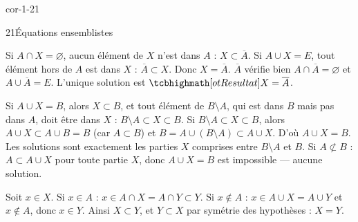 \begin{blocLivre}{cor-1-21}
\begin{corrige}{21}{Équations ensemblistes}
\begin{questions}
  \item {} Si $A\cap X=\varnothing$, aucun élément de $X$ n'est dans $A$ :
    $X\subset\overline{A}$. Si $A\cup X=E$, tout élément hors de $A$ est dans $X$ :
    $\overline{A}\subset X$. Donc $X=\overline{A}$.\quad
     $\overline{A}$ vérifie bien $A\cap\overline{A}=\varnothing$ et
    $A\cup\overline{A}=E$. L'unique solution est $\res{X=\overline{A}}$.
  \item {} Si $A\cup X=B$, alors $X\subset B$, et tout élément de $B\setminus A$, qui est
    dans $B$ mais pas dans $A$, doit être dans $X$ : $B\setminus A\subset X\subset B$.\quad
     Si $B\setminus A\subset X\subset B$, alors $A\cup X\subset A\cup B=B$ (car
    $A\subset B$) et $B=A\cup(B\setminus A)\subset A\cup X$. D'où $A\cup X=B$. Les solutions sont
    exactement les parties $X$ comprises entre $B\setminus A$ et $B$. Si $A\not\subset B$ :
    $A\subset A\cup X$ pour toute partie $X$, donc $A\cup X=B$ est impossible — aucune solution.
  \item Soit $x\in X$. Si $x\in A$ : $x\in A\cap X=A\cap Y\subset Y$. Si $x\notin A$ :
    $x\in A\cup X=A\cup Y$ et $x\notin A$, donc $x\in Y$. Ainsi $X\subset Y$, et $Y\subset X$ par
    symétrie des hypothèses : $X=Y$.
\end{questions}
\end{corrige}
\end{blocLivre}

